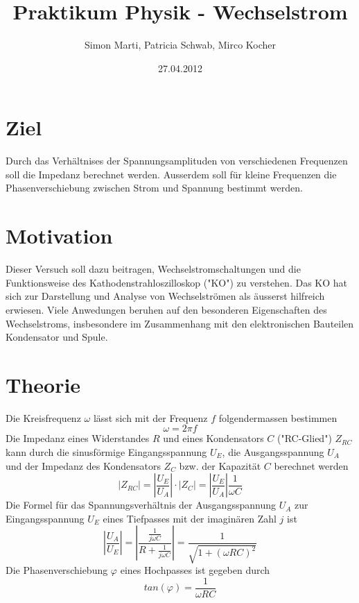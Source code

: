 \documentclass[12pt,a4paper]{article}
\title{Praktikum Physik - Wechselstrom}
\author{Simon Marti, Patricia Schwab, Mirco Kocher}
\date{27.04.2012}
\begin{document}
\maketitle

\section*{Ziel}
Durch das Verh\"altnises der Spannungsamplituden von verschiedenen Frequenzen soll die Impedanz berechnet werden.
Ausserdem soll f\"ur kleine Frequenzen die Phasenverschiebung zwischen Strom und Spannung bestimmt werden.


\section*{Motivation}
Dieser Versuch soll dazu beitragen, Wechselstromschaltungen und die Funktionsweise des Kathodenstrahloszilloskop ("KO") zu verstehen.
Das KO hat sich zur Darstellung und Analyse von Wechselstr\"omen als \"ausserst hilfreich erwiesen.
Viele Anwedungen beruhen auf den besonderen Eigenschaften des Wechselstroms, insbesondere im Zusammenhang mit den elektronischen Bauteilen Kondensator und Spule.


\section*{Theorie}
Die Kreisfrequenz $\omega$ l\"asst sich mit der Frequenz $f$ folgendermassen bestimmen
\begin{equation}
\omega = 2\pi f
\end{equation}
Die Impedanz eines Widerstandes $R$ und eines Kondensators $C$ ("RC-Glied") $Z_{RC}$ kann durch die sinusf\"ormige Eingangsspannung $U_E$, die Ausgangsspannung $U_A$ und der Impedanz des Kondensators $Z_C$ bzw. der Kapazit\"at $C$ berechnet werden
\begin{equation}
|Z_{RC}| = \left| \frac{U_E}{U_A} \right| \cdot |Z_C| = \left| \frac{U_E}{U_A} \right| \frac{1}{\omega C}
\end{equation}
Die Formel f\"ur das Spannungsverh\"altnis der Ausgangsspannung $U_A$ zur Eingangsspannung $U_E$ eines Tiefpasses mit der imagin\"aren Zahl $j$ ist
\begin{equation}
\left| \frac{U_A}{U_E} \right|= \left| \frac{\frac{1}{j\omega C}}{R + \frac{1}{j\omega C}}\right| = \frac{1}{\sqrt{1+(\omega RC)^2}}
\end{equation}
Die Phasenverschiebung $\varphi$  eines Hochpasses ist gegeben durch
\begin{equation}
tan(\varphi) = \frac{1}{\omega R C}
\end{equation}
\end{document}
